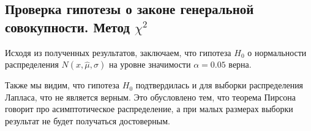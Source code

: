 \subsection{Проверка гипотезы о законе генеральной совокупности. Метод $\chi^2$}

Исходя из полученных результатов, заключаем, что гипотеза $H_0$ о нормальности распределения $N(x, \hat{\mu}, \hat{\sigma})$ на уровне значимости $\alpha = 0.05$ верна.

Также мы видим, что гипотеза $H_0$ подтвердилась и для выборки распределения Лапласа, что не является верным. Это обусловлено тем, что теорема Пирсона говорит про асимптотическое распределение, а при малых размерах выборки результат не будет получаться достоверным.